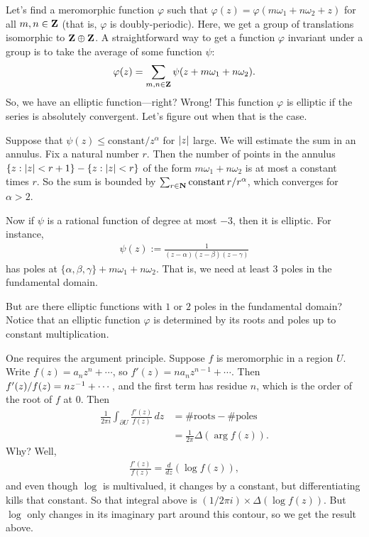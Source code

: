 \documentclass[11pt, oneside,margin=1in]{article}
\begin{document}
Let's find a meromorphic function $\varphi$ such that $\varphi(z) = \varphi (m\omega_1 + n\omega_2 + z)$ for all $m,n\in\mathbf Z$ (that is, $\varphi$ is doubly-periodic). Here, we get a group of translations isomorphic to $\mathbf Z\oplus\mathbf Z$. A straightforward way to get a function $\varphi$ invariant under a group is to take the average of some function $\psi$:  
 \begin{align*}
	\varphi(z) = \sum_{m,n\in \mathbf Z} \psi (z+m\omega_1 + n\omega_2).
\end{align*}
So, we have an elliptic function---right? Wrong! This function $\varphi$ is elliptic if the series is absolutely convergent. Let's figure out when that is the case.

Suppose that $\psi(z)\le \textrm{constant}/z^\alpha$ for $\left \lvert z \right \rvert$ large. We will estimate the sum in an annulus. Fix a natural number $r$. Then the number of points in the annulus $\{z : \left \lvert z \right \rvert < r+1\} - \{z : \left \lvert z \right \rvert < r\}$ of the form $m\omega_1 + n\omega_2$ is at most a constant times $r$. So the sum is bounded by $\sum _{r\in \mathbf N} \textrm{constant}\, r/r^\alpha$, which converges for $\alpha>2$.

Now if $\psi$ is a rational function of degree at most $-3$, then it is elliptic. For instance,
\begin{align*}
	\psi(z) := \frac{1}{ (z-\alpha) (z-\beta) (z-\gamma)}
\end{align*}
has poles at $\{\alpha,\beta,\gamma\}+m\omega_1 + n\omega_2$. That is, we need at least $3$ poles in the fundamental domain. 

But are there elliptic functions with $1$ or $2$ poles in the fundamental domain? Notice that an elliptic function $\varphi$ is determined by its roots and poles up to constant multiplication. 

One requires the argument principle. Suppose $f$ is meromorphic in a region $U$. Write $f(z) = a_nz^n+\cdots$, so $f'(z) = na_nz^{n-1} + \cdots$. Then $f'(z)/f (z) = nz^{-1} + \cdots$, and the first term has residue $n$, which is the order of the root of $f$ at $0$. Then 
\begin{align*}
\frac{1}{2\pi i} \int_{\partial U} \frac{f'(z)}{f (z)} \, dz &= \# \textrm{roots} - \#\textrm{poles} \\
							     &= \frac{1}{2\pi}\Delta (\arg f(z)).
\end{align*}
Why? Well, 
\begin{align*}
	\frac{f'(z)}{f (z)} = \frac{d}{dz} (\log  f(z)),
\end{align*}
and even though $\log$ is multivalued, it changes by a constant, but differentiating kills that constant. So that integral above is $(1/2\pi i)\times \Delta  (\log f(z))$. But $\log$ only changes in its imaginary part around this contour, so we get the result above.
\end{document}
